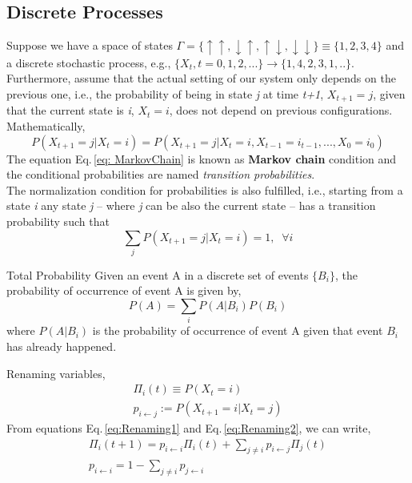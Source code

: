 \subsection{Discrete Processes}
Suppose we have a space of states $\Gamma = \{\uparrow \uparrow,\downarrow \uparrow,\uparrow \downarrow,\downarrow \downarrow \} \equiv \{1, 2, 3, 4 \}$ and a discrete stochastic process, e.g., $\{X_{t}, t= 0,1,2,...\} \rightarrow \{1,4,2,3,1,..\}$. Furthermore, assume that the actual setting of our system only depends on the previous one, i.e., the probability of being in state \textit{j} at time \textit{t+1}, $X_{t+1}= j$, given that the current state is \textit{i}, $X_{t} = i$, does not depend on previous configurations.\\
Mathematically,
\begin{equation}
\label{eq: MarkovChain}
    P\left(X_{t+1} = j | X_{t} = i\right) = P\left(X_{t+1}=j | X_{t} = i, X_{t-1} =i_{t-1},...,X_{0} = i_{0}\right)
\end{equation}
The equation Eq.\,\eqref{eq: MarkovChain} is known as \textbf{Markov chain} condition and the conditional probabilities are named \textit{transition probabilities}.\\
The normalization condition for probabilities is also fulfilled, i.e., starting from a state  \textit{i} any state \textit{j} -- where \textit{j} can be also the current state -- has a transition probability such that
\begin{equation}
    \sum_{j}P\left(X_{t+1} = j | X_{t} = i\right) = 1, \;\; \forall i
\end{equation}
\begin{theorem}{Total Probability}
Given an event A in a discrete set of events $\{B_{i}\}$, the probability of occurrence of event A is given by,
\begin{equation}
    P\left(A\right) = \sum_{i}P\left(A|B_{i}\right)P\left(B_{i}\right)
\end{equation}
where $P\left(A|B_{i}\right)$ is the probability of occurrence of event A given that event $B_{i}$ has already happened. 
\end{theorem}
Renaming variables,
\begin{align}
    \label{eq:Renaming1}
    \Pi_{i}(t) \equiv P\left(X_{t} = i\right) \\
    \label{eq:Renaming2}
    p_{i \leftarrow j} := P\left(X_{t+1} = i | X_{t}=j\right)
\end{align}
From equations Eq.\,\eqref{eq:Renaming1} and Eq.\,\eqref{eq:Renaming2}, we can write,
\begin{align}
        \Pi_{i}(t+1) = p_{i \leftarrow i}\Pi_{i}(t) + \sum_{j \neq i} p_{i \leftarrow j}\Pi_{j}(t) \\ 
        p_{i \leftarrow i} = 1 - \sum_{j\neq i}p_{j \leftarrow i}
\end{align}
